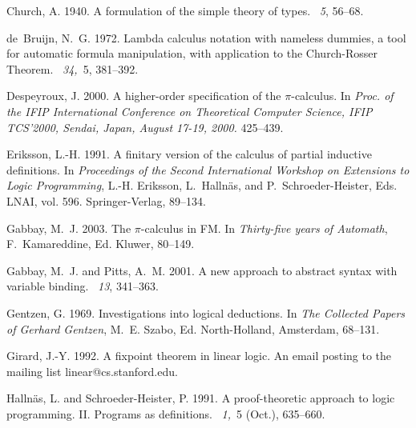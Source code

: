 \documentclass{acmtrans2m}
\begin{document}
\begin{thebibliography}{}
{\sc Church, A.} 1940.
\newblock A formulation of the simple theory of types.
~{\em 5}, 56--68.

{\sc de~Bruijn, N.~G.} 1972.
\newblock Lambda calculus notation with nameless dummies, a tool for automatic
  formula manipulation, with application to the {Church-Rosser Theorem}.
~{\em 34,\/}~5, 381--392.

{\sc Despeyroux, J.} 2000.
\newblock A higher-order specification of the $\pi$-calculus.
\newblock In {\em Proc. of the IFIP International Conference on Theoretical
  Computer Science, IFIP TCS'2000, Sendai, Japan, August 17-19, 2000.}
  425--439.

{\sc Eriksson, L.-H.} 1991.
\newblock A finitary version of the calculus of partial inductive definitions.
\newblock In {\em Proceedings of the Second International Workshop on
  Extensions to Logic Programming}, {L.-H. Eriksson}, {L.~Halln{\"{a}}s}, {and}
  {P.~Schroeder-Heister}, Eds. LNAI, vol. 596. Springer-Verlag, 89--134.

{\sc Gabbay, M.~J.} 2003.
\newblock The $\pi$-calculus in {FM}.
\newblock In {\em Thirty-five years of {A}utomath}, {F.~Kamareddine}, Ed.
  Kluwer, 80--149.

{\sc Gabbay, M.~J.} {\sc and} {\sc Pitts, A.~M.} 2001.
\newblock A new approach to abstract syntax with variable binding.
~{\em 13}, 341--363.

{\sc Gentzen, G.} 1969.
\newblock Investigations into logical deductions.
\newblock In {\em {The Collected Papers of Gerhard Gentzen}}, {M.~E. Szabo},
  Ed. North-Holland, Amsterdam, 68--131.

{\sc Girard, J.-Y.} 1992.
\newblock A fixpoint theorem in linear logic.
\newblock An email posting to the mailing list linear@cs.stanford.edu.

{\sc Halln{\"{a}}s, L.} {\sc and} {\sc Schroeder-Heister, P.} 1991.
\newblock A proof-theoretic approach to logic programming. {II}. {Programs} as
  definitions.
~{\em 1,\/}~5 (Oct.), 635--660.


\end{thebibliography}
\end{document}
